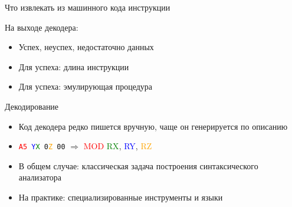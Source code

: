 \documentclass{beamer}
\begin{document}
\begin{frame}{Что извлекать из машинного кода инструкции}
\begin{center}
\end{center}

На выходе декодера: 
\begin{itemize}
\item Успех, неуспех, недостаточно данных
\item Для успеха: длина инструкции
\item Для успеха: эмулирующая процедура
\end{itemize}
\end{frame}







\begin{frame}{Декодирование}
\begin{itemize}
\item Код декодера редко пишется вручную, чаще он генерируется по описанию
\item \texttt{\textcolor{red}{A5} \textcolor{blue}{Y}\textcolor{green}{X} 0\textcolor{orange}{Z} 00} $\Rightarrow$ \textcolor{red}{MOD} \textcolor{green}{RX}, \textcolor{blue}{RY}, \textcolor{orange}{RZ}
\item В общем случае: классическая задача построения  синтаксического анализатора
\item На практике: специализированные инструменты и языки
\end{itemize}
\end{frame}
\end{document}
